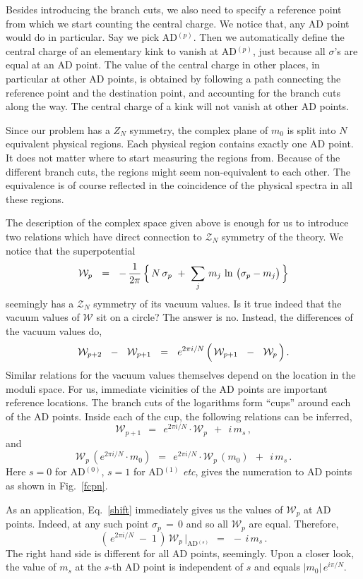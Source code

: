 \documentclass[epsfig,12pt]{article}
\def\beq{\begin{equation}}
\def\eeq{\end{equation}}
\def\beq{\begin{equation}}
\def\eeq{\end{equation}}
\newcommand{\mc}[1]{\mathcal{#1}}
\newcommand{\W}{\mathcal{W}}
\begin{document}
	Besides introducing the branch cuts, we also need to specify a reference point from which we start counting
	the central charge.
	We notice that, any AD point would do in particular.
	Say we pick AD$^{(p)}$.
	Then we automatically define the central charge of an elementary kink to vanish at AD$^{(p)}$,  just because
	all $ \sigma $'s are equal at an AD point.
	The value of the central charge in other places, in particular at other AD points, is obtained by following
	a path connecting the reference point and the destination point, and accounting for the branch cuts
	along the way. 
	The central charge of a kink will not vanish at other AD points. 

	Since our problem has a $ Z_N $ symmetry, the complex plane of $ m_0 $ is split into $ N $ equivalent physical
	regions.
	Each physical region contains exactly one AD point.
	It does not matter where to start measuring the regions from.
	Because of the different branch cuts, the regions might seem non-equivalent to each other.
	The equivalence is of course reflected in the coincidence of the physical spectra in all these regions. 


	The description of the complex space given above is enough for us to introduce two relations which have
	direct connection to $ \mc{Z}_N $ symmetry of the theory.
	We notice that the superpotential
\beq
	\W_p ~~=~~ 
		-\, \frac{1}{2\pi}\,  
                \Bigl\{\, N\, \sigma_p ~+~ \sum_j\, m_j\, \ln\, \big( \sigma_p - m_j \big) \,\Bigr\}
\eeq
	seemingly has a $ \mc{Z}_N $ symmetry of its vacuum values. 
	Is it true indeed that the vacuum values of $ \W $ sit on a circle?
	The answer is no. 
	Instead, the differences of the vacuum values do,
\beq
	\W_{p+2}  ~~-~~  \W_{p+1}  ~~=~~ 
        e^{2 \pi i / N}\, \Bigl(\,  \W_{p+1}  ~~-~~ \W_{p}   \,\Bigr) \,.
\eeq
	Similar relations for the vacuum values themselves depend on the location in the moduli space.
	For us, immediate vicinities of the AD points are important reference locations.
	The branch cuts of the logarithms form ``cups'' around each of the AD points.
	Inside each of the cup, the following relations can be inferred,
\beq
\label{shift}
	\W_{p+1} ~~=~~ e^{2 \pi i / N} \cdot \W_p ~~+~~ i\, m_s\,,
\eeq
	and
\beq
\label{shiftm}
	\W_p\, (e^{2 \pi i / N} \cdot m_0) ~~=~~ e^{2 \pi i / N} \cdot \W_p\, (m_0) ~~+~~ i\, m_s\,.
\eeq
	Here $ s = 0 $ for AD$^{(0)}$, $ s = 1 $ for AD$^{(1)}$ {\it etc}, gives the numeration
	to AD points as shown in Fig.~\ref{fcpn}.

	As an application, Eq.~\eqref{shift} immediately gives us the values of $ \W_p $ at AD points.
	Indeed, at any such point $ \sigma_p \,=\, 0 $ and so all $ \W_p $ are equal.
	Therefore,
\beq
	\left(\, e^{2 \pi i / N} \;-\; 1 \,\right)\, \W_p\, \biggr|_\text{AD$^{(s)}$} ~~=~~ -\, i\, m_s\,.
\eeq
	The right hand side is different for all AD points, seemingly. 
	Upon a closer look, the value of $ m_s $ at the $ s $-th AD point is independent of $ s $ and equals
	$ |m_0|\,e^{i \pi / N} $.
\end{document}
